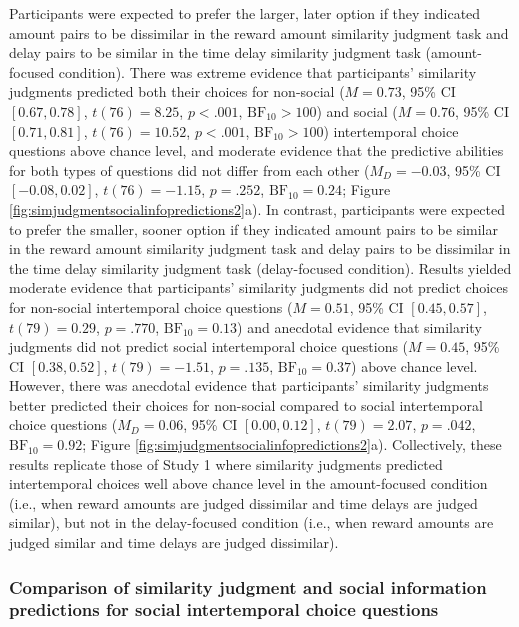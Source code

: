 \documentclass[
  pub,floatsintext]{apa6}
\begin{document}
Participants were expected to prefer the larger, later option if they indicated amount pairs to be dissimilar in the reward amount similarity judgment task and delay pairs to be similar in the time delay similarity judgment task (amount-focused condition). There was extreme evidence that participants' similarity judgments predicted both their choices for non-social (\(M = 0.73\), 95\% CI \([0.67, 0.78]\), \(t(76) = 8.25\), \(p < .001\), \(\mathrm{BF}_{\textrm{10}} > 100\)) and social (\(M = 0.76\), 95\% CI \([0.71, 0.81]\), \(t(76) = 10.52\), \(p < .001\), \(\mathrm{BF}_{\textrm{10}} > 100\)) intertemporal choice questions above chance level, and moderate evidence that the predictive abilities for both types of questions did not differ from each other (\(M_D = -0.03\), 95\% CI \([-0.08, 0.02]\), \(t(76) = -1.15\), \(p = .252\), \(\mathrm{BF}_{\textrm{10}} = 0.24\); Figure \ref{fig:simjudgmentsocialinfopredictions2}a). In contrast, participants were expected to prefer the smaller, sooner option if they indicated amount pairs to be similar in the reward amount similarity judgment task and delay pairs to be dissimilar in the time delay similarity judgment task (delay-focused condition). Results yielded moderate evidence that participants' similarity judgments did not predict choices for non-social intertemporal choice questions (\(M = 0.51\), 95\% CI \([0.45, 0.57]\), \(t(79) = 0.29\), \(p = .770\), \(\mathrm{BF}_{\textrm{10}} = 0.13\)) and anecdotal evidence that similarity judgments did not predict social intertemporal choice questions (\(M = 0.45\), 95\% CI \([0.38, 0.52]\), \(t(79) = -1.51\), \(p = .135\), \(\mathrm{BF}_{\textrm{10}} = 0.37\)) above chance level. However, there was anecdotal evidence that participants' similarity judgments better predicted their choices for non-social compared to social intertemporal choice questions (\(M_D = 0.06\), 95\% CI \([0.00, 0.12]\), \(t(79) = 2.07\), \(p = .042\), \(\mathrm{BF}_{\textrm{10}} = 0.92\); Figure \ref{fig:simjudgmentsocialinfopredictions2}a). Collectively, these results replicate those of Study 1 where similarity judgments predicted intertemporal choices well above chance level in the amount-focused condition (i.e., when reward amounts are judged dissimilar and time delays are judged similar), but not in the delay-focused condition (i.e., when reward amounts are judged similar and time delays are judged dissimilar).

\hypertarget{comparison-of-similarity-judgment-and-social-information-predictions-for-social-intertemporal-choice-questions-1}{%
\subsubsection{Comparison of similarity judgment and social information predictions for social intertemporal choice questions}\label{comparison-of-similarity-judgment-and-social-information-predictions-for-social-intertemporal-choice-questions-1}}
\end{document}
